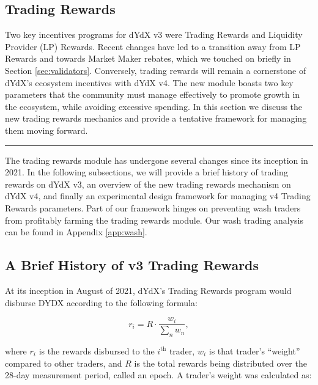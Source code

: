 \begin{fullwidth}
    \section{Trading Rewards} \label{sec:incentives}

    \begin{adjustwidth}{2cm}{2cm}
        \justify
        Two key incentives programs for dYdX v3 were Trading Rewards and Liquidity Provider (LP) Rewards. Recent changes have led to a transition away from LP Rewards and towards Market Maker rebates, which we touched on briefly in Section \ref{sec:validators}. Conversely, trading rewards will remain a cornerstone of dYdX's ecosystem incentives with dYdX v4. The new module boasts two key parameters that the community must manage effectively to promote growth in the ecosystem, while avoiding excessive spending. In this section we discuss the new trading rewards mechanics and provide a tentative framework for managing them moving forward.
    \end{adjustwidth}
    
    \textcolor{gray}{\rule{\linewidth}{0.1mm}}
\end{fullwidth}

    The trading rewards module has undergone several changes since its inception in 2021. In the following subsections, we will provide a brief history of trading rewards on dYdX v3, an overview of the new trading rewards mechanism on dYdX v4, and finally an experimental design framework for managing v4 Trading Rewards parameters. Part of our framework hinges on preventing wash traders from profitably farming the trading rewards module. Our wash trading analysis can be found in Appendix \ref{app:wash}.

    \subsection{A Brief History of v3 Trading Rewards}

        At its inception in August of 2021, dYdX's Trading Rewards program would disburse DYDX according to the following formula:

        \begin{equation}
            r_i = R \cdot \frac{w_i}{\sum_n{w_n}},
        \end{equation}

        where $r_i$ is the rewards disbursed to the $i^{\text{th}}$ trader, $w_i$ is that trader's ``weight'' compared to other traders, and $R$ is the total rewards being distributed over the 28-day measurement period, called an epoch. A trader's weight was calculated as:

